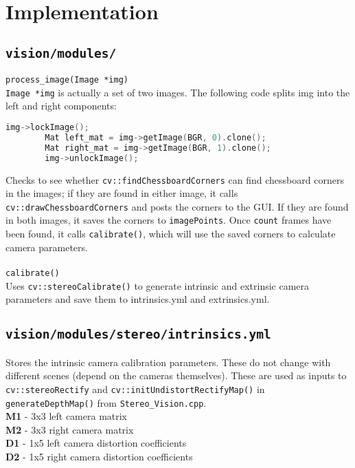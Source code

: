 \documentclass[11pt]{article}
\begin{document}
\section{Implementation}
    \subsection{\texttt{vision/modules/}}
    \texttt{process\_image(Image *img)} \\
    \texttt{Image *img} is actually a set of two images. The following code splits img into the left and right components:
    \begin{lstlisting}[language=C++]
        img->lockImage();
        Mat left_mat = img->getImage(BGR, 0).clone();
        Mat right_mat = img->getImage(BGR, 1).clone();
        img->unlockImage();
    \end{lstlisting}
    Checks to see whether \texttt{cv::findChessboardCorners} can find chessboard corners in the images; if they are found in either image, it calls \texttt{cv::draw\-ChessboardCorners} and posts the corners to the GUI. If they are found in both images, it saves the corners to \texttt{imagePoints}. Once \texttt{count} frames have been found, it calls \texttt{calibrate()}, which will use the saved corners to calculate camera parameters. \\
    \\
    \texttt{calibrate()} \\
    Uses \texttt{cv::stereoCalibrate()} to generate intrinsic and extrinsic camera parameters and save them to intrinsics.yml and extrinsics.yml.
    \subsection{\texttt{vision/modules/stereo/intrinsics.yml}}
    Stores the intrinsic camera calibration parameters. These do not change with different scenes (depend on the cameras themselves). These are used as inputs to \texttt{cv::stereoRectify} and \texttt{cv::initUndistortRectifyMap()} in \texttt{generateDepthMap()} from \texttt{Stereo\_Vision.cpp}.\\
    \textbf{M1} - 3x3 left camera matrix \\
    \textbf{M2} - 3x3 right camera matrix \\
    \textbf{D1} - 1x5 left camera distortion coefficients \\
    \textbf{D2} - 1x5 right camera distortion coefficients \\
\end{document}
